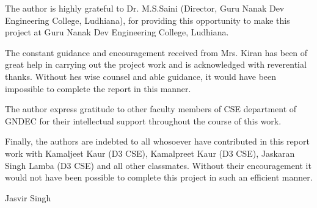 \begin{Large}
\end{Large}
The author is highly grateful to Dr. M.S.Saini (Director, Guru
Nanak Dev Engineering College, Ludhiana), for providing this
opportunity to make this project at Guru Nanak Dev Engineering College, 
Ludhiana.

The constant guidance and encouragement received from Mrs. Kiran has 
been of great help in carrying out the project work and is acknowledged 
with reverential thanks. Without hes wise counsel and able guidance, 
it would have been impossible to complete the report in this manner.

The author express gratitude to other faculty members of CSE department 
of GNDEC for their intellectual support throughout the course of this 
work.

Finally, the authors are indebted to all whosoever have contributed in
this report work with Kamaljeet Kaur (D3 CSE), Kamalpreet Kaur (D3 CSE), 
Jaskaran Singh Lamba (D3 CSE) and all other classmates. Without their 
encouragement it would not have been possible to complete this project
in such an efficient manner.

\vskip 1.0cm 
\noindent Jasvir Singh
